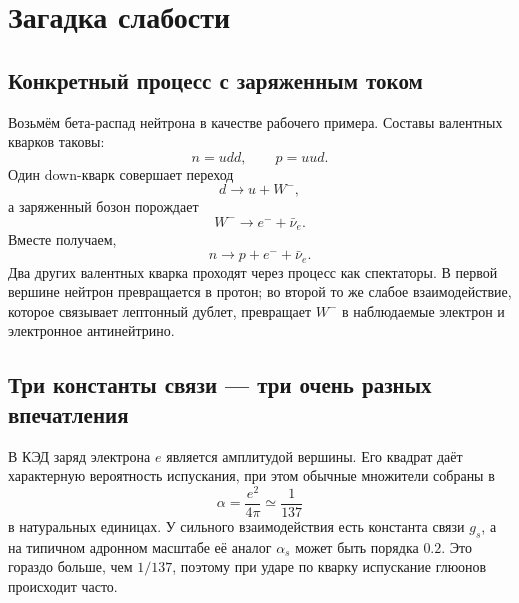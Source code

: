 \section{Загадка слабости}

\subsection{Конкретный процесс с заряженным током}

Возьмём бета-распад нейтрона в качестве рабочего примера. Составы валентных кварков таковы:
\begin{equation}
  n=udd,\qquad p=uud.
\end{equation}
Один down-кварк совершает переход
\begin{equation}
  d\longrightarrow u+W^-,
\end{equation}
а заряженный бозон порождает
\begin{equation}
  W^-\longrightarrow e^-+\bar\nu_e.
\end{equation}
Вместе получаем,
\begin{equation}
  n\longrightarrow p+e^-+\bar\nu_e.
\end{equation}
Два других валентных кварка проходят через процесс как спектаторы. В первой вершине нейтрон превращается в протон; во второй то же слабое взаимодействие, которое связывает лептонный дублет, превращает \(W^-\) в наблюдаемые электрон и электронное антинейтрино.

\subsection{Три константы связи — три очень разных впечатления}

В КЭД заряд электрона \(e\) является амплитудой вершины. Его квадрат даёт характерную вероятность испускания, при этом обычные множители собраны в
\begin{equation}
  \alpha=\frac{e^2}{4\pi}\simeq\frac1{137}
\end{equation}
в натуральных единицах. У сильного взаимодействия есть константа связи \(g_s\), а на типичном адронном масштабе её аналог \(\alpha_s\) может быть порядка \(0.2\). Это гораздо больше, чем \(1/137\), поэтому при ударе по кварку испускание глюонов происходит часто.


